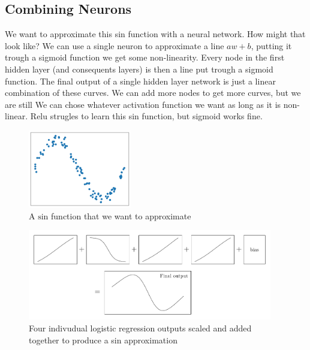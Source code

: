 \documentclass[twoside,11pt]{report}
\begin{document}
\subsection*{Combining Neurons}
\label{app:neuronscombined}

    We want to approximate this sin function with a neural network. How might that look like?
    We can use a single neuron to approximate a line $a w + b$, putting it trough a sigmoid function
    we get some non-linearity. Every node in the first hidden layer (and consequents layers) is then 
    a line put trough a sigmoid function. The final output of a single hidden layer network is just
    a linear combination of these curves. We can add more nodes to get more curves, but we are still
    We can chose whatever activation function we want as long as it is non-linear. Relu strugles to learn this 
    sin function, but sigmoid works fine.


    \begin{figure}
        \begin{center}
            \includegraphics[width=0.4\textwidth]{../runsAndFigures/sin.png}
        \end{center}
        \caption{A $\text{sin}$ function that we want to approximate}\label{fig:sin}
    \end{figure}

    \begin{figure}
        \begin{center}
            \includegraphics[width=0.95\textwidth]{tikzfigures/universal.pdf}
        \end{center}
        \caption{Four indivudual logistic regression outputs scaled and added together to produce 
        a sin approximation}\label{fig:universal}
    \end{figure}
\end{document}
